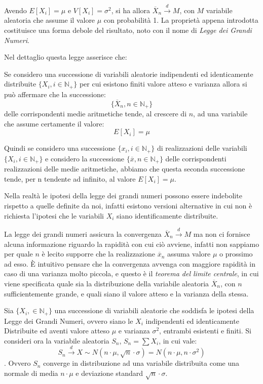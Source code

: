 \documentclass[a4paper,12pt, oneside]{book}
\newcommand{\numberset}{\mathbb}
\newcommand{\N}{\numberset{N}}
\begin{document}
Avendo $E[X_i] = \mu$ e $V[X_i] = \sigma^2$, si ha allora $\overline{X}_n \stackrel{d}{\longrightarrow} M$,
con $M$ variabile aleatoria che assume il valore $\mu$ con probabilità 1.\newline
La proprietà appena introdotta costituisce una forma debole del risultato, noto con il nome di \emph{Legge dei Grandi Numeri}.

Nel dettaglio questa legge asserisce che:
\begin{teo}
Se considero una successione di variabili aleatorie indipendenti ed identicamente distribuite $\{X_i, i \in \N_+\}$
per cui esistono finiti valore atteso e varianza allora si può affermare che la successione:
\[\{\overline{X}_n, n \in \N_+\}\]
delle corrispondenti medie aritmetiche tende, al crescere di $n$, ad una variabile che assume certamente il valore:
\[E[X_i]=\mu\]
\end{teo}
Quindi se considero una successione $\{x_i, i \in \N_+\}$ di realizzazioni delle variabili $\{X_i, i \in \N_+\}$
e considero la successione $\{\overline{x}, n \in \N_+\}$ delle corrispondenti realizzazioni delle medie aritmetiche,
abbiamo che questa seconda successione tende, per n tendente ad infinito, al valore $E[X_i] = \mu$.

Nella realtà le ipotesi della legge dei grandi numeri possono essere indebolite rispetto a quelle definite da
noi, infatti esistono versioni alternative in cui non è richiesta l'ipotesi che le variabili $X_i$ siano
identificamente distribuite.

La legge dei grandi numeri assicura la convergenza $\overline{X}_n \stackrel{d}{\longrightarrow} M$ ma non ci
fornisce alcuna informazione riguardo la rapidità con cui ciò avviene, infatti non sappiamo per quale $n$ è
lecito supporre che la realizzazione $\overline{x}_n$ assuma valore $\mu$ o prossimo ad esso.\newline
È intuitivo pensare che la convergenza avvenga con maggiore rapidità in caso di una varianza molto piccola, e
questo è il \emph{teorema del limite centrale}, in cui viene specificata quale sia la distribuzione della
variabile aleatoria $\overline{X}_n$, con $n$ sufficientemente grande, e quali siano il valore atteso e la
varianza della stessa.

Sia $\{X_i,\in\N_+\}$ una successione di variabili aleatorie che soddisfa le ipotesi della Legge dei Grandi
Numeri, ovvero siano le $X_i$ indipendenti ed identicamente Distribuite ed aventi valore atteso $\mu$ e 
varianza $\sigma^2$, entrambi esistenti e finiti.\newline
Si consideri ora la variabile aleatoria $S_n$, $S_n = \sum X_i$, in cui vale:
\[S_n \stackrel{d}{\longrightarrow} X \sim N(n \cdot \mu, \sqrt{n} \cdot \sigma) = N(n \cdot \mu, n \cdot \sigma^2)\].
Ovvero $S_n$ converge in distribuzione ad una variabile distribuita come una normale di media $n \cdot \mu$ e
deviazione standard $\sqrt{n} \cdot \sigma$.
\end{document}

